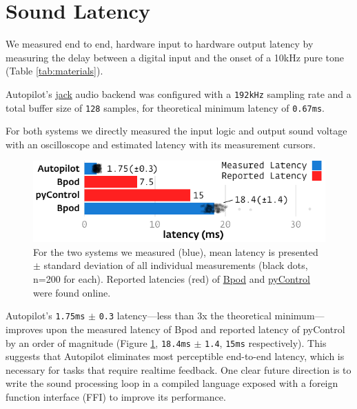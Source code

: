 \section{Sound Latency}
\label{sec:soundlatency}

We measured end to end, hardware input to hardware output latency by measuring the delay between a digital input and the onset of a 10kHz pure tone (Table \ref{tab:materials}). 

Autopilot's \href{http://jackaudio.org/}{jack} audio backend was configured with a \texttt{192kHz} sampling rate and a total buffer size of \texttt{128} samples, for theoretical minimum latency of \texttt{0.67ms}.

For both systems we directly measured the input logic and output sound voltage with an oscilloscope and estimated latency with its measurement cursors. %
%
\begin{figure}[hb!]
\caption{For the two systems we measured (blue), mean latency is presented $\pm$ standard deviation of all individual measurements (black dots, n=200 for each). Reported latencies (red) of \href{https://sites.google.com/site/bpoddocumentation/bpod-user-guide/function-reference/psychtoolboxsoundserver}{Bpod} and \href{https://pycontrol.readthedocs.io/en/latest/user-guide/hardware/\#audio_player}{pyControl} were found online.}
\label{fig:lags}
\includegraphics{figures/test_1_lags.pdf}
\end{figure}

Autopilot's  \texttt{1.75ms} $\pm$ \texttt{0.3} latency---less than 3x the theoretical minimum---improves upon the measured latency of Bpod and reported latency of pyControl by an order of magnitude (Figure \ref{fig:lags}, \texttt{18.4ms} $\pm$ \texttt{1.4}, \texttt{15ms} respectively). This suggests that Autopilot eliminates most perceptible end-to-end latency, which is necessary for tasks that require realtime feedback. One clear future direction is to write the sound processing loop in a compiled language exposed with a foreign function interface (FFI) to improve its performance.